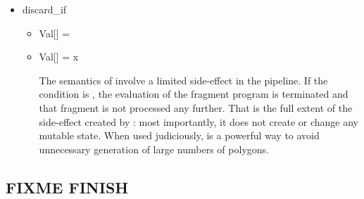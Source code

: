 \documentclass{article}
\begin{document}
\begin{itemize}
\begin{itemize}
\end{itemize}\item discard\_if \begin{itemize}
\item Val[] = 
\item Val[] = x

  The semantics of  involve a limited side-effect in the
  pipeline. If the condition is \true, the evaluation of the fragment
  program is terminated and that fragment is not processed any
  further. That is the full extent of the side-effect created by
  : most importantly, it does not create or change any
  mutable state. When used judiciously,  is a powerful way to
  avoid unnecessary generation of large numbers of polygons.

\end{itemize}
\end{itemize}

\subsection{FIXME FINISH}
  
\end{document}
